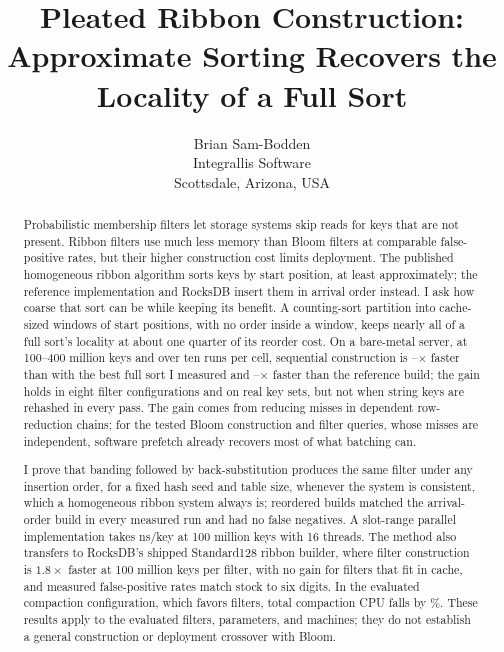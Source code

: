 \documentclass{article}
\title{Pleated Ribbon Construction:\\
Approximate Sorting Recovers the Locality of a Full Sort}
\author{%
  Brian Sam-Bodden \\
  Integrallis Software \\
  Scottsdale, Arizona, USA \\
}
\begin{document}
\maketitle

\begin{abstract}
Probabilistic membership filters let storage systems skip reads for keys that are not present. Ribbon filters use much less memory than Bloom filters at comparable false-positive rates, but their higher construction cost limits deployment. The published homogeneous ribbon algorithm sorts keys by start position, at least approximately; the reference implementation and RocksDB insert them in arrival order instead. I ask how coarse that sort can be while keeping its benefit. A counting-sort partition into cache-sized windows of start positions, with no order inside a window, keeps nearly all of a full sort's locality at about one quarter of its reorder cost. On a bare-metal server, at 100--400 million keys and over ten runs per cell, sequential construction is \esevensortpartfour--\esevensortpartcent$\times$ faster than with the best full sort I measured and \esevenrefpartcent--\esevenrefpartfour$\times$ faster than the reference build; the gain holds in eight filter configurations and on real key sets, but not when string keys are rehashed in every pass. The gain comes from reducing misses in dependent row-reduction chains; for the tested Bloom construction and filter queries, whose misses are independent, software prefetch already recovers most of what batching can.

I prove that banding followed by back-substitution produces the same filter under any insertion order, for a fixed hash seed and table size, whenever the system is consistent, which a homogeneous ribbon system always is; reordered builds matched the arrival-order build in every measured run and had no false negatives. A slot-range parallel implementation takes \esevenpartotalsixteen{} ns/key at 100 million keys with 16 threads. The method also transfers to RocksDB's shipped Standard128 ribbon builder, where filter construction is $1.8\times$ faster at 100 million keys per filter, with no gain for filters that fit in cache, and measured false-positive rates match stock to six digits. In the evaluated compaction configuration, which favors filters, total compaction CPU falls by \esevencompreduction\%. These results apply to the evaluated filters, parameters, and machines; they do not establish a general construction or deployment crossover with Bloom.
\end{abstract}
\end{document}
